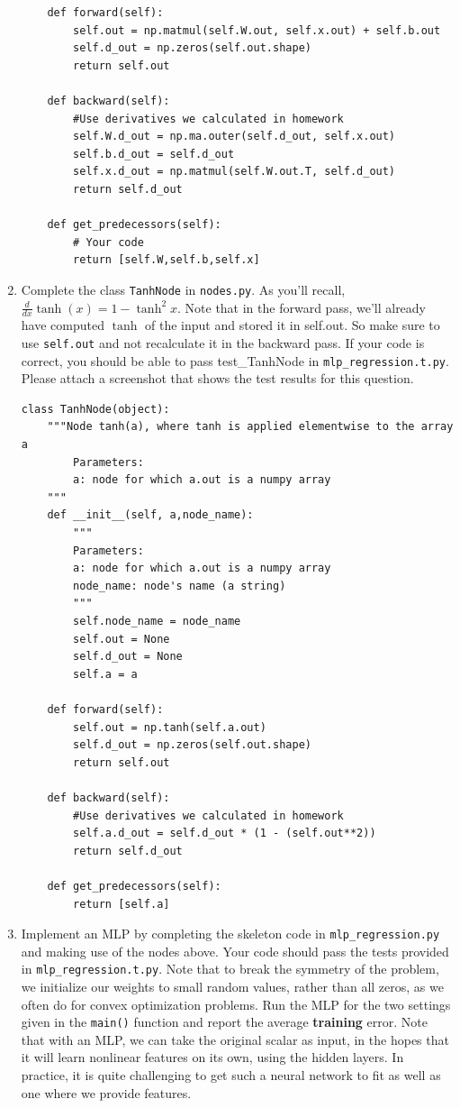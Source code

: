 \documentclass{article}
\theoremstyle{plain}
\theoremstyle{definition}
\begin{document}
\begin{enumerate}
\begin{verbatim}
    def forward(self):
        self.out = np.matmul(self.W.out, self.x.out) + self.b.out
        self.d_out = np.zeros(self.out.shape)
        return self.out

    def backward(self):
        #Use derivatives we calculated in homework
        self.W.d_out = np.ma.outer(self.d_out, self.x.out)
        self.b.d_out = self.d_out
        self.x.d_out = np.matmul(self.W.out.T, self.d_out)
        return self.d_out

    def get_predecessors(self):
        # Your code
        return [self.W,self.b,self.x]
\end{verbatim}

\item Complete the class \texttt{TanhNode} in \texttt{nodes.py}. As you'll
recall, $\frac{d}{dx}\tanh(x)=1-\tanh^{2}x$. Note that in the forward
pass, we'll already have computed $\tanh$ of the input and stored
it in self.out. So make sure to use \texttt{self.out} and not recalculate
it in the backward pass. If your code is correct, you should be able to pass test\_TanhNode in \texttt{mlp\_regression.t.py}. Please attach a screenshot that shows the test results for this question.
\subitem
\begin{verbatim}
class TanhNode(object):
    """Node tanh(a), where tanh is applied elementwise to the array a
        Parameters:
        a: node for which a.out is a numpy array
    """
    def __init__(self, a,node_name):
        """ 
        Parameters:
        a: node for which a.out is a numpy array
        node_name: node's name (a string)
        """
        self.node_name = node_name
        self.out = None
        self.d_out = None
        self.a = a

    def forward(self):
        self.out = np.tanh(self.a.out)
        self.d_out = np.zeros(self.out.shape)
        return self.out

    def backward(self):
        #Use derivatives we calculated in homework
        self.a.d_out = self.d_out * (1 - (self.out**2))
        return self.d_out

    def get_predecessors(self):
        return [self.a]
\end{verbatim}

\item Implement an MLP by completing the skeleton code in \texttt{mlp\_regression.py}
and making use of the nodes above. Your code should pass the tests
provided in \texttt{mlp\_regression.t.py}. Note that to break the symmetry
of the problem, we initialize our weights to small random values,
rather than all zeros, as we often do for convex optimization problems.
Run the MLP for the two settings given in the \texttt{main()} function
and report the average \textbf{training} error. Note that with an
MLP, we can take the original scalar as input, in the hopes that it
will learn nonlinear features on its own, using the hidden layers.
In practice, it is quite challenging to get such a neural network
to fit as well as one where we provide features.
\subitem


\end{enumerate}
\end{document}
